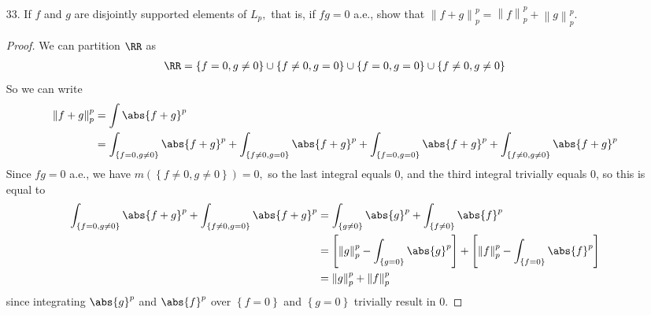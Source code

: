 \documentclass{article}
\begin{document}
\begin{itemize}
	\item[33.] If $f$ and $g$ are disjointly supported elements of $L_p,$ that is, if $fg=0$ a.e., show that $\left\lVert f+g \right\rVert_p^p=\left\lVert f \right\rVert_p^p + \left\lVert g \right\rVert_p^p.$
		\begin{proof}
			We can partition $\RR$ as
			\begin{align*}
				\RR = \left\{ f=0, g\neq 0 \right\} \cup \left\{ f\neq 0, g=0 \right\}\cup \left\{ f=0, g=0 \right\}\cup \left\{ f\neq0, g\neq 0 \right\}
			\end{align*}
			So we can write
			\begin{align*}
				\left\lVert f+g \right\rVert_p^p &= \int \abs{f+g}^p \\
				&= \int_{ \left\{ f=0, g\neq 0 \right\}}\abs{f+g}^p + \int_{ \left\{ f\neq 0, g=0 \right\}} \abs{f+g}^p + \int_{ \left\{ f=0, g=0 \right\}}\abs{f+g}^p + \int_{ \left\{ f\neq 0, g\neq 0 \right\}}\abs{f+g}^p
			\end{align*}
			Since $fg=0$ a.e., we have $m\left(\left\{ f\neq 0, g\neq 0 \right\}\right)=0,$ so the last integral equals 0, and the third integral trivially equals 0, so this is equal to
			\begin{align*}
				\int_{ \left\{ f=0, g\neq 0 \right\}}\abs{f+g}^p + \int_{ \left\{ f\neq 0, g=0 \right\}} \abs{f+g}^p &= \int_{ \left\{ g\neq0 \right\}} \abs{g}^p + \int_{ \left\{ f\neq 0 \right\}} \abs{f}^p \\
				&=\left[ \left\lVert g \right\rVert_p^p -\int_{ \left\{ g=0 \right\}}\abs{g}^p\right] + \left[ \left\lVert f \right\rVert_p^p -\int_{ \left\{ f=0 \right\}}\abs{f}^p\right] \\
				&= \left\lVert g \right\rVert_p^p + \left\lVert f \right\rVert_p^p
			\end{align*}
			since integrating $\abs{g}^p$ and $\abs{f}^p$ over $\left\{ f=0 \right\}$ and $\left\{ g=0 \right\}$ trivially result in 0.
		\end{proof}
		
\end{itemize}
\end{document}
